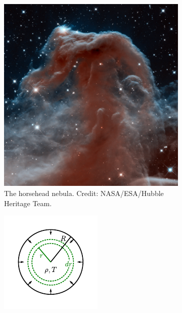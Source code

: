 \begin{figure}[tb]
    \centering
    \begin{subfigure}{0.44\textwidth}
        \includegraphics[width=\textwidth]{graphics/star_formation/horsehead_nebula}
        \caption{The horsehead nebula. Credit: NASA/ESA/Hubble Heritage Team.}
        \label{fig:star_formation:horsehead_nebula}
    \end{subfigure} \qquad
    \begin{subfigure}{0.459\textwidth}
        \includegraphics[width=\textwidth]{graphics/star_formation/molecular_cloud_collapse.pdf}

\end{subfigure}
\end{figure}

